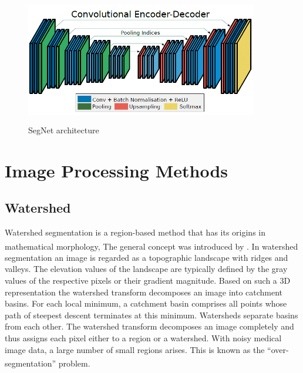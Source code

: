 \begin{figure}[h]
\centering
  \vspace{-0.1in}
    \centerline{\includegraphics[width = 4in, height = 2.2in]{../images/segnet.png}}
    \caption{SegNet architecture}
\end{figure}

\section{Image Processing Methods}
\vspace{0.2in}
\hspace*{0.16in}

\subsection{Watershed}

Watershed segmentation is a region-based method that has its origins in mathematical morphology, The general concept was introduced by \textsuperscript{\cite{digabel1978iterative}}.
In watershed segmentation an image is regarded as a topographic landscape with ridges and valleys. The elevation values of the landscape are typically defined by the gray values of the respective pixels or their gradient magnitude. Based on such a 3D representation the watershed transform decomposes an image into catchment basins. For each local minimum, a catchment basin comprises all points whose path of steepest descent terminates at this minimum. Watersheds separate basins from each other. The watershed transform decomposes an image completely and thus assigns each pixel either to a region or a watershed. With noisy medical image data, a large number of small regions arises. This is known as the “over-segmentation” problem. \textsuperscript{\cite{Vincent_And_Soille_2022_sciencedirect}}

